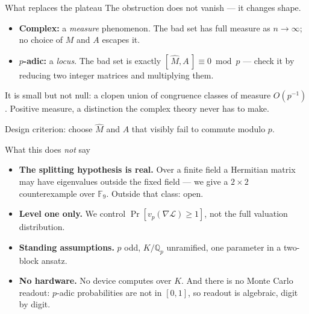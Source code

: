 \documentclass[aspectratio=169,10pt]{beamer}
\newcommand{\Qp}{\mathbb{Q}_p}
\newcommand{\FF}{\mathbb{F}}
\newcommand{\loss}{\mathcal{L}}
\begin{document}
\begin{frame}{What replaces the plateau}
  The obstruction does not vanish --- it changes shape.

  \begin{itemize}
    \item \textbf{Complex:} a \emph{measure} phenomenon. The bad set has full
      measure as $n\to\infty$; no choice of $M$ and $A$ escapes it.
    \item \textbf{$p$-adic:} a \emph{locus}. The bad set is exactly
      $[\,\widehat M,A\,]\equiv0\bmod p$ --- check it by reducing two integer
      matrices and multiplying them.
  \end{itemize}

  \vspace{0.5em}
  It is small but \alert{not null}: a clopen union of congruence classes of
  measure $O(p^{-1})$. Positive measure, a distinction the complex theory never
  has to make.

  \vspace{0.5em}
  \alert{Design criterion:} choose $\widehat M$ and $A$ that visibly fail to
  commute modulo $p$.
\end{frame}

\begin{frame}{What this does \emph{not} say}
  \begin{itemize}
    \item \textbf{The splitting hypothesis is real.} Over a finite field a
      Hermitian matrix may have eigenvalues outside the fixed field --- we give
      a $2\times2$ counterexample over $\FF_9$. Outside that class: open.
    \item \textbf{Level one only.} We control $\Pr[v_p(\nabla\loss)\ge1]$, not
      the full valuation distribution.
    \item \textbf{Standing assumptions.} $p$ odd, $K/\Qp$ unramified, one
      parameter in a two-block ansatz.
    \item \textbf{No hardware.} No device computes over $K$. And there is no
      Monte Carlo readout: $p$-adic probabilities are not in $[0,1]$, so
      readout is algebraic, digit by digit.
  \end{itemize}
\end{frame}
\end{document}

